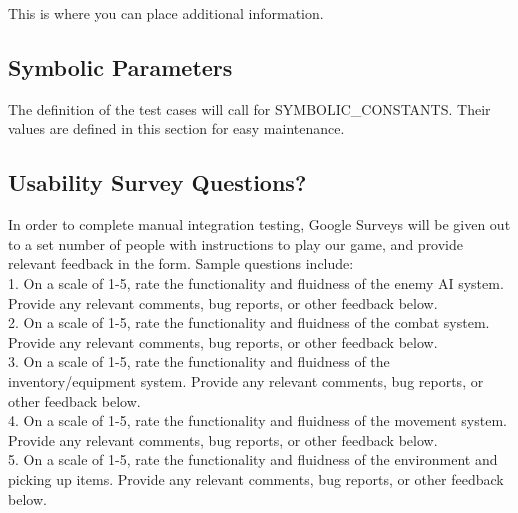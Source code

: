 \documentclass[12pt, titlepage]{article}
\begin{document}
This is where you can place additional information.

\subsection{Symbolic Parameters}

The definition of the test cases will call for SYMBOLIC\_CONSTANTS.
Their values are defined in this section for easy maintenance.

\subsection{Usability Survey Questions?}

In order to complete manual integration testing, Google Surveys will be given out to a set number of people with instructions to play our game, and provide relevant feedback in the form. Sample questions include: \\

1. On a scale of 1-5, rate the functionality and fluidness of the enemy AI system. Provide any relevant comments, bug reports, or other feedback below.\\

2. On a scale of 1-5, rate the functionality and fluidness of the combat system. Provide any relevant comments, bug reports, or other feedback below.\\

3. On a scale of 1-5, rate the functionality and fluidness of the inventory/equipment system. Provide any relevant comments, bug reports, or other feedback below.\\

4. On a scale of 1-5, rate the functionality and fluidness of the movement system. Provide any relevant comments, bug reports, or other feedback below.\\

5. On a scale of 1-5, rate the functionality and fluidness of the environment and picking up items. Provide any relevant comments, bug reports, or other feedback below.\\
\end{document}
